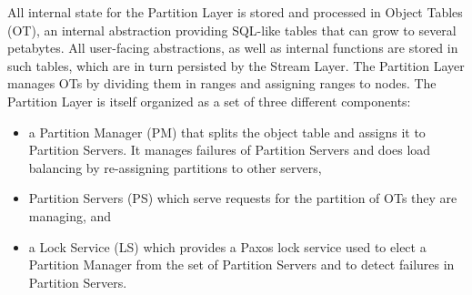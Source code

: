 All internal state for the Partition Layer is stored and processed in Object Tables (OT), an internal abstraction providing SQL-like tables that can grow to several petabytes.
All user-facing abstractions, as well as internal functions are stored in such tables, which are in turn persisted by the Stream Layer.
The Partition Layer manages OTs by dividing them in ranges and assigning ranges to nodes.
The Partition Layer is itself organized as a set of three different components:
\begin{itemize}
    \item a Partition Manager (PM) that splits the object table and assigns it to Partition Servers. It manages failures of Partition Servers and does load balancing by re-assigning partitions to other servers,
    \item Partition Servers (PS) which serve requests for the partition of OTs they are managing, and
    \item a Lock Service (LS) which provides a Paxos \cite{DBLP:journals/tocs/Lamport98} lock service used to elect a Partition Manager from the set of Partition Servers and to detect failures in Partition Servers.
\end{itemize}